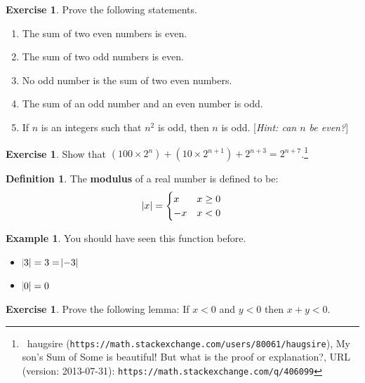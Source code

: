 \documentclass[a4paper, 10pt]{amsart}
\theoremstyle{definition}
\newtheorem{defn}[thm]{Definition}
\newtheorem{ex}[thm]{Example}
\newtheorem{exercise}[thm]{Exercise}
\theoremstyle{remark}
\begin{document}
\begin{exercise}
  Prove the following statements.
  \begin{enumerate}
    \item The sum of two even numbers is even.
    \item The sum of two odd numbers is even.
    \item No odd number is the sum of two even numbers.
    \item The sum of an odd number and an even number is odd.
    \item If $ n $ is an integers such that $ n^2 $ is odd, then $ n $ is odd. [\textit{Hint: can $ n $ be even?}]
  \end{enumerate}
\end{exercise}

\begin{exercise}
  Show that $ (100 \times 2^n) + (10 \times 2^{n + 1}) + 2^{n + 3} = 2^{n + 7} $.\footnote{~haugsire (\texttt{https://math.stackexchange.com/users/80061/haugsire}), My son's Sum of Some is beautiful! But what is the proof or explanation?, URL (version: 2013-07-31): \texttt{https://math.stackexchange.com/q/406099}}
\end{exercise}

\begin{defn}
  The \textbf{modulus} of a real number is defined to be:
  \begin{displaymath}
    \abs{x} = \begin{cases}
                x & x \geq 0\\
                -x & x < 0
              \end{cases}
  \end{displaymath}
\end{defn}

\begin{ex}
  You should have seen this function before.

  \begin{itemize}
    \item $ \abs{3} = 3 = \abs{-3} $
    \item $ \abs{0} = 0 $
  \end{itemize}
\end{ex}

\begin{exercise}
  Prove the following lemma: If $ x < 0 $ and $ y < 0 $ then $ x + y < 0 $.
\end{exercise}
\end{document}
